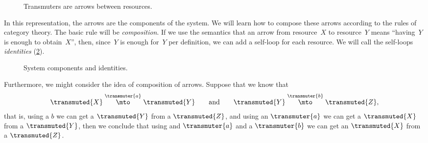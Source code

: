 




\begin{figure}[h!]
    \centering
    \caption{Transmuters are arrows between resources.}
    \label{fig:e2}
\end{figure}

In this representation, the arrows are the components of the system.
We will learn how to compose these arrows according to the rules of category theory.
The basic rule will be \emph{composition}.
If we use the semantics that an arrow from resource~$X$ to resource~$Y$ means ``having~$Y$ is
enough to obtain~$X$'', then, since~$Y$ is enough for~$Y$ per definition, we can add a self-loop for each
resource. We will call the self-loops \emph{identities} (\cref{fig:e3}).

\begin{figure}[h!]
    \centering
    \caption{System components and identities. }
    \label{fig:e3}
\end{figure}


Furthermore, we might consider the idea of composition of arrows.
Suppose that we know that
\begin{equation*}
    \transmuted{X} \stackrel{\transmuter{a}}{\mto} \transmuted{Y}
    \qquad \text{and} \qquad
    \transmuted{Y} \stackrel{\transmuter{b}}{\mto} \transmuted{Z},
\end{equation*}
that is, using a $b$ we can get a $\transmuted{Y}$ from a $\transmuted{Z}$, and using an $\transmuter{a}$ we can get a $\transmuted{X}$ from a $\transmuted{Y}$,
then we conclude that using and $\transmuter{a}$ and a $\transmuter{b}$ we can get an $\transmuted{X}$ from a $\transmuted{Z}$.


